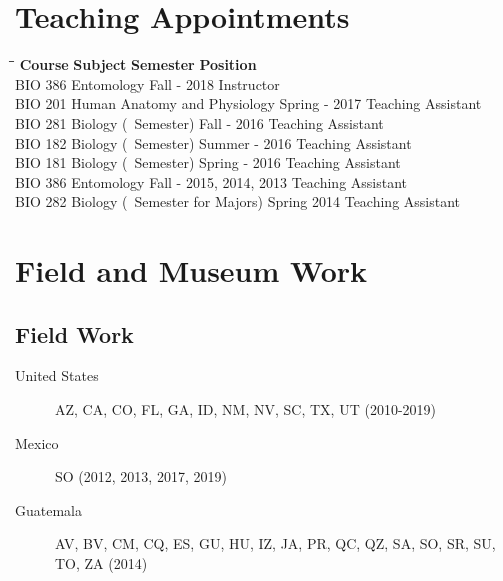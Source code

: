 \documentclass[12pt,a4paper]{article}
\begin{document}
\section*{Teaching Appointments}
	\begin{tabbing}
		\hspace{2cm}\=\hspace{6.5cm}\=\hspace{4cm}\=\kill
		\textbf{Course} \> \textbf{Subject} \> \textbf{Semester} \> \textbf{Position}\\
		BIO 386 \> Entomology \> Fall - 2018 \> Instructor \\ 
		BIO 201 \> Human Anatomy and Physiology \> Spring - 2017 \> Teaching Assistant \\
		BIO 281 \> Biology (~Semester) \> Fall - 2016 \> Teaching Assistant \\
		BIO 182 \> Biology (~Semester) \> Summer - 2016 \> Teaching Assistant \\
		BIO 181 \> Biology (~Semester) \> Spring - 2016 \> Teaching Assistant \\
		BIO 386 \> Entomology \> Fall - 2015, 2014, 2013 \> Teaching Assistant \\
		BIO 282 \> Biology (~Semester for Majors) \> Spring 2014 \> Teaching Assistant
	\end{tabbing} 

\section*{Field and Museum Work}
	\subsection*{Field Work}
		\begin{description}
			\item [United States] \tabto*{3cm} AZ, CA, CO, FL, GA, ID, NM, NV, SC, TX, UT (2010-2019)
			\item [Mexico] \tabto*{3cm} SO (2012, 2013, 2017, 2019)
			\item [Guatemala] \tabto*{3cm} AV, BV, CM, CQ, ES, GU, HU, IZ, JA, PR, QC, QZ, SA, SO, SR, SU, TO, ZA (2014)
		\end{description}
\end{document}
